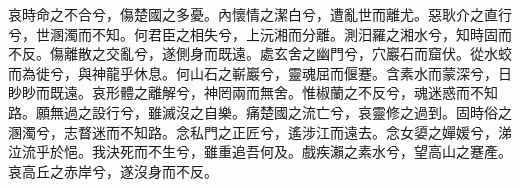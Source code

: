 
\begin{pinyinscope}
哀時命之不合兮，傷楚國之多憂。內懷情之潔白兮，遭亂世而離尤。惡耿介之直行兮，世溷濁而不知。何君臣之相失兮，上沅湘而分離。測汨羅之湘水兮，知時固而不反。傷離散之交亂兮，遂側身而既遠。處玄舍之幽門兮，穴巖石而窟伏。從水蛟而為徙兮，與神龍乎休息。何山石之嶄巖兮，靈魂屈而偃蹇。含素水而蒙深兮，日眇眇而既遠。哀形體之離解兮，神罔兩而無舍。惟椒蘭之不反兮，魂迷惑而不知路。願無過之設行兮，雖滅沒之自樂。痛楚國之流亡兮，哀靈修之過到。固時俗之溷濁兮，志瞀迷而不知路。念私門之正匠兮，遙涉江而遠去。念女嬃之嬋媛兮，涕泣流乎於悒。我決死而不生兮，雖重追吾何及。戲疾瀨之素水兮，望高山之蹇產。哀高丘之赤岸兮，遂沒身而不反。


\end{pinyinscope}
